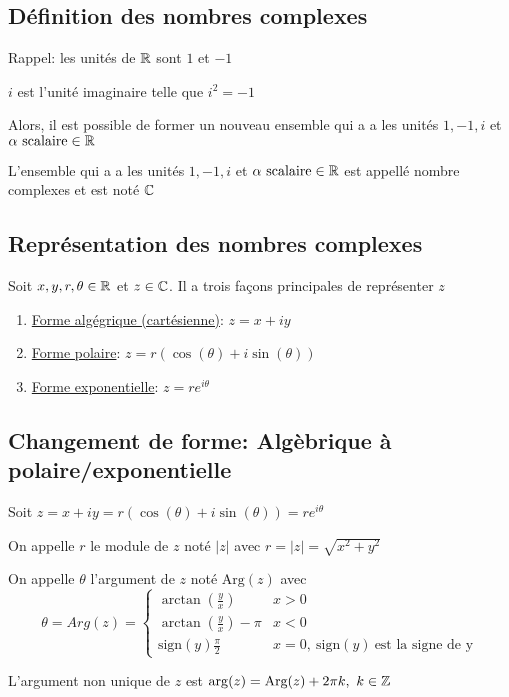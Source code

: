 
\subsection{Définition des nombres complexes}
Rappel: les unités de $\mathbb{R}$ sont $1$ et $-1$ 
\begin{definition}
    $i$ est l'unité imaginaire telle que $i^2 = -1$ 
\end{definition}
Alors, il est possible de former un nouveau ensemble qui a a les unités $1, -1, i$ et $\alpha \text{ scalaire} \in \mathbb{R}$
\begin{definition}
    L'ensemble qui a a les unités $1, -1, i$ et $\alpha \text{ scalaire} \in \mathbb{R}$ est appellé nombre complexes et est noté $\mathbb{C}$
\end{definition}

\subsection{Représentation des nombres complexes}
Soit $x, y, r, \theta \in \mathbb{R}$ et $z \in \mathbb{C}$. Il a trois façons principales de représenter $z$
\begin{enumerate}
    \item \underline{Forme algégrique (cartésienne)}: $z = x + iy$
    \item \underline{Forme polaire}: $z = r(\cos(\theta)+i\sin(\theta))$
    \item \underline{Forme exponentielle}: $z = re^{i\theta}$
\end{enumerate}

\subsection{Changement de forme: Algèbrique à polaire/exponentielle}
Soit $z = x + iy = r(\cos(\theta)+i\sin(\theta)) = re^{i\theta}$ 
\begin{definition}
    On appelle $r$ le module de $z$ noté $|z|$ avec $r = |z| = \sqrt{x^2 + y^2}$
\end{definition}
\begin{definition}
On appelle $\theta$ l'argument de $z$ noté $\text{Arg}(z)$ avec \[\theta = Arg(z) =
    \begin{cases}
        \arctan(\frac{y}{x})       & x > 0                            \\
        \arctan(\frac{y}{x}) - \pi & x < 0                            \\
        \text{sign}(y)\frac{\pi}{2}           & x = 0, \ \text{sign}(y) \ \text{est la signe de y}
    \end{cases}\]
\end{definition}
\begin{remark}
    L'argument non unique de $z$ est $\arg(z) = \text{Arg}(z) + 2\pi k, \ k \in \mathbb{Z}$
\end{remark}

